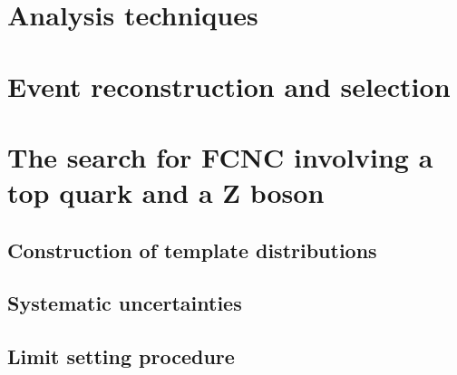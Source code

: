 \chapter{Analysis techniques}


%

\chapter{Event reconstruction and selection}


\chapter{The search for FCNC involving a top quark and a Z boson}
\section{Construction of template distributions}
\section{Systematic uncertainties}
\section{Limit setting procedure}
